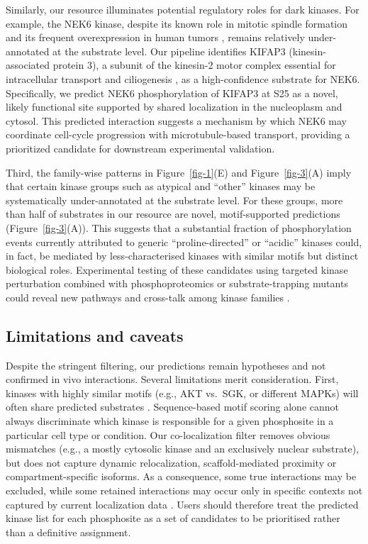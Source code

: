 \documentclass[
  number,
  preprint,
  onecolumn]{elsarticle}
\begin{document}
Similarly, our resource illuminates potential regulatory roles for dark
kinases. For example, the NEK6 kinase, despite its known role in mitotic
spindle formation and its frequent overexpression in human tumors
\citep{Gao2025-pt}, remains relatively under-annotated at the substrate
level. Our pipeline identifies KIFAP3 (kinesin-associated protein 3), a
subunit of the kinesin-2 motor complex essential for intracellular
transport and ciliogenesis \citep{Onodera2021-eh}, as a high-confidence
substrate for NEK6. Specifically, we predict NEK6 phosphorylation of
KIFAP3 at S25 as a novel, likely functional site supported by shared
localization in the nucleoplasm and cytosol. This predicted interaction
suggests a mechanism by which NEK6 may coordinate cell-cycle progression
with microtubule-based transport, providing a prioritized candidate for
downstream experimental validation.

Third, the family-wise patterns in Figure~\ref{fig-1}(E) and
Figure~\ref{fig-3}(A) imply that certain kinase groups such as atypical
and ``other'' kinases may be systematically under-annotated at the
substrate level. For these groups, more than half of substrates in our
resource are novel, motif-supported predictions (Figure~\ref{fig-3}(A)).
This suggests that a substantial fraction of phosphorylation events
currently attributed to generic ``proline-directed'' or ``acidic''
kinases could, in fact, be mediated by less-characterised kinases with
similar motifs but distinct biological roles. Experimental testing of
these candidates using targeted kinase perturbation combined with
phosphoproteomics or substrate-trapping mutants could reveal new
pathways and cross-talk among kinase families
\citep{Miller2008-ey, Linding2007-rk, Gerritsen2021-cr, Liu2023-re}.

\subsection{Limitations and caveats}\label{limitations-and-caveats}

Despite the stringent filtering, our predictions remain hypotheses and
not confirmed in vivo interactions. Several limitations merit
consideration. First, kinases with highly similar motifs (e.g., AKT
vs.~SGK, or different MAPKs) will often share predicted substrates
\citep{Johnson2023-ai, Miller2018-hi, Muller-Dott2025-yf}.
Sequence-based motif scoring alone cannot always discriminate which
kinase is responsible for a given phosphosite in a particular cell type
or condition. Our co-localization filter removes obvious mismatches
(e.g., a mostly cytosolic kinase and an exclusively nuclear substrate),
but does not capture dynamic relocalization, scaffold-mediated proximity
or compartment-specific isoforms. As a consequence, some true
interactions may be excluded, while some retained interactions may occur
only in specific contexts not captured by current localization data
\citep{Thul2017-cl}. Users should therefore treat the predicted kinase
list for each phosphosite as a set of candidates to be prioritised
rather than a definitive assignment.
\end{document}
